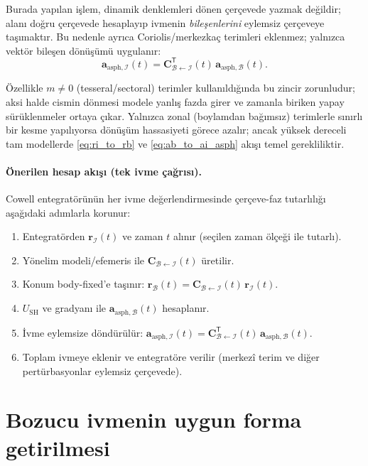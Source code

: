 Burada yapılan işlem, dinamik denklemleri dönen çerçevede yazmak değildir; alanı doğru çerçevede hesaplayıp ivmenin
\emph{bileşenlerini} eylemsiz çerçeveye taşımaktır. Bu nedenle ayrıca Coriolis/merkezkaç terimleri eklenmez;
yalnızca vektör bileşen dönüşümü uygulanır:
\begin{equation}
\label{eq:ab_to_ai_asph}
\mathbf a_{\text{asph},\mathcal I}(t)=
\mathbf C_{\mathcal B\leftarrow\mathcal I}^{\mathsf T}(t)\,
\mathbf a_{\text{asph},\mathcal B}(t).
\end{equation}

Özellikle $m\neq 0$ (tesseral/sectoral) terimler kullanıldığında bu zincir zorunludur; aksi halde cismin dönmesi modele
yanlış fazda girer ve zamanla biriken yapay sürüklenmeler ortaya çıkar. Yalnızca zonal (boylamdan bağımsız) terimlerle
sınırlı bir kesme yapılıyorsa dönüşüm hassasiyeti görece azalır; ancak yüksek dereceli tam modellerde
\eqref{eq:ri_to_rb} ve \eqref{eq:ab_to_ai_asph} akışı temel gerekliliktir.

\paragraph{Önerilen hesap akışı (tek ivme çağrısı).}
Cowell entegratörünün her ivme değerlendirmesinde çerçeve-faz tutarlılığı aşağıdaki adımlarla korunur:
\begin{enumerate}
\item Entegratörden $\mathbf r_{\mathcal I}(t)$ ve zaman $t$ alınır (seçilen zaman ölçeği ile tutarlı).
\item Yönelim modeli/efemeris ile $\mathbf C_{\mathcal B\leftarrow\mathcal I}(t)$ üretilir.
\item Konum body-fixed’e taşınır: $\mathbf r_{\mathcal B}(t)=\mathbf C_{\mathcal B\leftarrow\mathcal I}(t)\,\mathbf r_{\mathcal I}(t)$.
\item $U_{\text{SH}}$ ve gradyanı ile $\mathbf a_{\text{asph},\mathcal B}(t)$ hesaplanır.
\item İvme eylemsize döndürülür: $\mathbf a_{\text{asph},\mathcal I}(t)=\mathbf C_{\mathcal B\leftarrow\mathcal I}^{\mathsf T}(t)\,\mathbf a_{\text{asph},\mathcal B}(t)$.
\item Toplam ivmeye eklenir ve entegratöre verilir (merkezî terim ve diğer pertürbasyonlar eylemsiz çerçevede).
\end{enumerate}


\section{Bozucu ivmenin uygun forma getirilmesi}
\label{sec:perturbing_accel_frames}

